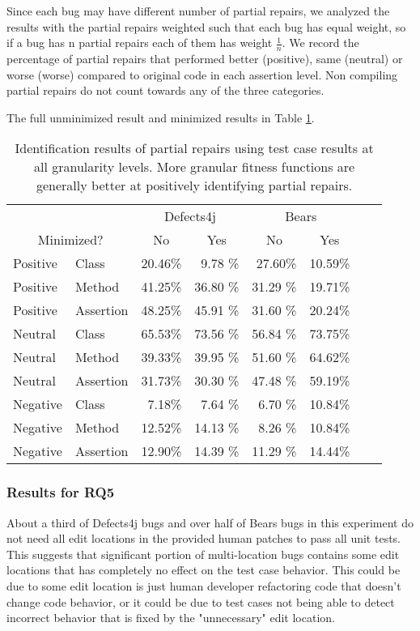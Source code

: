 \documentclass[sigconf, timestamp-false, anonymous=true]{acmart}
\begin{document}
Since each bug may have different 
number of partial repairs, we analyzed the results with the partial repairs weighted such that each bug
has equal weight, so if a bug has n partial repairs each of them has weight 
$\frac{1}{n}$. We record the percentage of partial repairs that performed better (positive), same (neutral)
or worse (worse) compared to original code in each assertion level. Non compiling
partial repairs do not count towards any of the three categories.

The full unminimized result and minimized results in Table \ref{yiweitable}.


\begin{table}
{\begin{center}
\begin{tabular}{ll|rr|rrrr}
\toprule
\multicolumn{2}{c}{}&\multicolumn{2}{c}{Defects4j} & \multicolumn{2}{c}{Bears} \\
\multicolumn{2}{c}{Minimized?} & \multicolumn{1}{c}{No} & \multicolumn{1}{c}{Yes} & \multicolumn{1}{c}{No} & \multicolumn{1}{c}{Yes}  \\
\midrule
Positive & Class & 20.46\% & 9.78 \% & 27.60\% & 10.59\%  \\
Positive & Method & 41.25\% & 36.80 \% & 31.29 \% & 19.71\%  \\
Positive & Assertion & 48.25\% & 45.91 \% & 31.60 \% & 20.24\%  \\ 
\midrule
Neutral & Class & 65.53\% & 73.56 \% & 56.84 \% & 73.75\% \\
Neutral & Method & 39.33\% & 39.95 \% & 51.60 \% & 64.62\%  \\
Neutral & Assertion & 31.73\% & 30.30 \% & 47.48 \% &  59.19\%  \\ 
\midrule
Negative & Class & 7.18\% & 7.64 \% & 6.70 \% & 10.84\%  \\
Negative & Method & 12.52\% & 14.13 \% & 8.26 \% & 10.84\%  \\
Negative & Assertion & 12.90\% & 14.39 \% & 11.29 \% &  14.44\%  \\ 
\bottomrule
\end{tabular}
\end{center}}
\caption{Identification results of partial repairs using test case results
at all granularity levels.
More granular fitness functions are generally better at positively identifying partial repairs.}
\label{yiweitable}
\end{table}

\subsubsection{Results for RQ5}
About a third of Defects4j bugs and over half of
Bears bugs in this experiment do not need all edit locations in the provided human patches to pass
all unit tests. This suggests that significant portion of multi-location bugs contains some
edit locations that has completely no effect on the test case behavior. This could be due to some
edit location is just human developer refactoring code that doesn't change code behavior,
or it could be due to test cases not being able to detect incorrect behavior that is fixed
by the "unnecessary" edit location.
\end{document}
